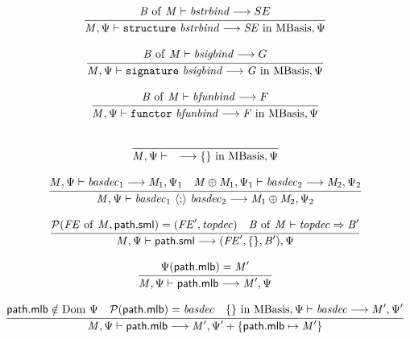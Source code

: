 \documentclass[draft]{article}
\renewcommand{\mit}[1]{\mathit{#1}}
\newcommand{\mrm}[1]{\mathrm{#1}}
\newcommand{\mtt}[1]{\mathtt{#1}}
\newcommand{\mcal}[1]{\mathcal{#1}}
\newcommand{\msf}[1]{\mathsf{#1}}
\newcommand{\infrule}[2]{{\frac{\displaystyle\strut{#1}}{\displaystyle\strut{#2}}}}
\newcommand{\judge}[2]{\infrule{#1}{#2}}
\begin{document}
\begin{equation}
\judge{
\mit{B}~\mrm{of}~\mit{M} \vdash \mit{bstrbind} \longrightarrow SE
}{
\mit{M}, \Psi  \vdash \mtt{structure}~ \mit{bstrbind}
\longrightarrow \mit{SE} ~\mrm{in}~ \mrm{MBasis}, \Psi
}
\end{equation}

\begin{equation}
\judge{
\mit{B}~\mrm{of}~\mit{M} \vdash \mit{bsigbind} \longrightarrow G
}{
\mit{M}, \Psi  \vdash \mtt{signature}~ \mit{bsigbind}
\longrightarrow \mit{G } ~\mrm{in}~ \mrm{MBasis}, \Psi
}
\end{equation}

\begin{equation}
\judge{
\mit{B}~\mrm{of}~\mit{M} \vdash \mit{bfunbind} \longrightarrow F
}{
\mit{M}, \Psi  \vdash \mtt{functor}~ \mit{bfunbind}
\longrightarrow \mit{F} ~\mrm{in}~ \mrm{MBasis}, \Psi
}
\end{equation}

\begin{equation}
\judge{
}{
\mit{M}, \Psi  \vdash \quad \longrightarrow \{\} ~\mrm{in}~ \mrm{MBasis}, \Psi
}
\end{equation}

\begin{equation}
\judge{
\mit{M}, \Psi  \vdash \mit{basdec}_1 \longrightarrow \mit{M}_1, \Psi_1 \quad
\mit{M} \oplus \mit{M}_1, \Psi_1  \vdash \mit{basdec}_2 \longrightarrow \mit{M}_2, \Psi_2 
}{
\mit{M}, \Psi  \vdash \mit{basdec}_1 ~\langle\mtt{;}\rangle~ \mit{basdec}_2 \longrightarrow \mit{M}_1 \oplus \mit{M}_2, \Psi_2
}
\end{equation}

\begin{equation}
\label{eqn:mlb:SS:path.sml}
\judge{
\mcal{P}(\mit{FE}~\mrm{of}~\mit{M}, \msf{path.sml}) = (\mit{FE}', \mit{topdec}) \quad
\mit{B}~\mrm{of}~\mit{M} \vdash \mit{topdec} \Rightarrow \mit{B}'
}{
\mit{M}, \Psi  \vdash \msf{path.sml}  \longrightarrow (\mit{FE}',\{\},\mit{B}'), \Psi
}
\end{equation}

\begin{equation}
\judge{
\Psi(\msf{path.mlb}) = \mit{M}'
}{
\mit{M}, \Psi  \vdash \msf{path.mlb}  \longrightarrow \mit{M}', \Psi
}
\end{equation}

\begin{equation}
\judge{
\msf{path.mlb} \notin \mrm{Dom}~\Psi \quad
\mcal{P}(\msf{path.mlb}) = \mit{basdec} \quad
\{\} ~\mrm{in}~ \mrm{MBasis}, \Psi  \vdash \mit{basdec} \longrightarrow \mit{M}', \Psi'
}{
\mit{M}, \Psi  \vdash \msf{path.mlb}  \longrightarrow \mit{M}', \Psi' + \{\msf{path.mlb} \mapsto \mit{M}'\} 
}
\end{equation}
\end{document}
